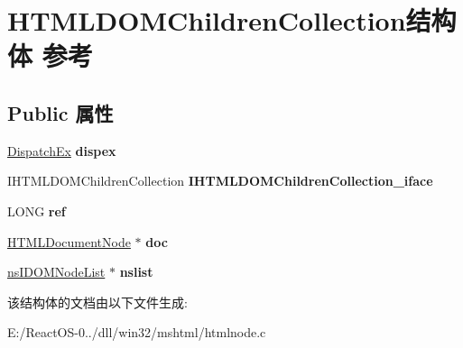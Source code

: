 \hypertarget{struct_h_t_m_l_d_o_m_children_collection}{}\section{H\+T\+M\+L\+D\+O\+M\+Children\+Collection结构体 参考}
\label{struct_h_t_m_l_d_o_m_children_collection}
\subsection*{Public 属性}
\begin{DoxyCompactItemize}
\item 
\mbox{\label{struct_h_t_m_l_d_o_m_children_collection_a1f708f69650c78d9c2f7de4121cfe9e8}} 
\hyperlink{struct_dispatch_ex}{Dispatch\+Ex} {\bfseries dispex}
\item 
\mbox{\label{struct_h_t_m_l_d_o_m_children_collection_ac73b3cb05f8c8e311b10e7773c1f8441}} 
I\+H\+T\+M\+L\+D\+O\+M\+Children\+Collection {\bfseries I\+H\+T\+M\+L\+D\+O\+M\+Children\+Collection\+\_\+iface}
\item 
\mbox{\label{struct_h_t_m_l_d_o_m_children_collection_aace9c91069064bb8ed4690364735bd7c}} 
L\+O\+NG {\bfseries ref}
\item 
\mbox{\label{struct_h_t_m_l_d_o_m_children_collection_aa8a70a5bbcc5198943a19612488cb90b}} 
\hyperlink{struct_h_t_m_l_document_node}{H\+T\+M\+L\+Document\+Node} $\ast$ {\bfseries doc}
\item 
\mbox{\label{struct_h_t_m_l_d_o_m_children_collection_a005acf863a5a2b99c24beb156241d0e3}} 
\hyperlink{interfacens_i_d_o_m_node_list}{ns\+I\+D\+O\+M\+Node\+List} $\ast$ {\bfseries nslist}
\end{DoxyCompactItemize}


该结构体的文档由以下文件生成\+:\begin{DoxyCompactItemize}
\item 
E\+:/\+React\+O\+S-\/0../dll/win32/mshtml/htmlnode.\+c\end{DoxyCompactItemize}
